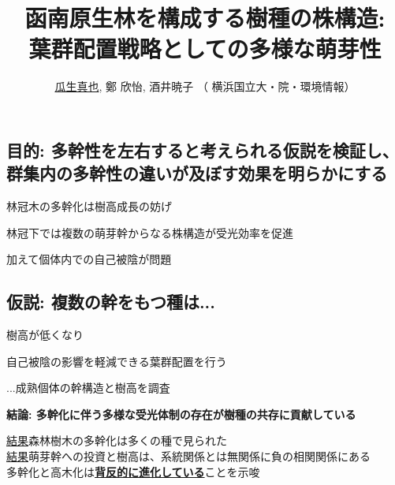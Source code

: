 \documentclass[a0, 36pt, plainboxedsections]{sciposter} %
\title{\textcolor{Blue1}{函南原生林を構成する樹種の株構造:\\葉群配置戦略としての多様な萌芽性}}
\author{\faGroup \hspace{0.02em} \underline{瓜生真也}, 鄭 欣怡, 酒井暁子 （\faUniv \hspace{0.02em} 横浜国立大・院・環境情報） \normalsize{\faEnvelope \hspace{0.02em} \fontspec{ComicSansMS}{suika1127@gmail.com}}}
\begin{document}
\maketitle
\vspace{-2em}
\begin{multicols}{2}
\begin{mdframed}[style=section.frame]
  \centering\huge\textbf{}
\end{mdframed}

\subsection*{目的: 多幹性を左右すると考えられる仮説を検証し、群集内の多幹性の違いが及ぼす効果を明らかにする} %

林冠木の多幹化は樹高成長の妨げ

林冠下では複数の萌芽幹からなる株構造が受光効率を促進

加えて個体内での自己被陰が問題

\subsection*{仮説: 複数の幹をもつ種は...}

\begin{list}{}{\setlength{\itemindent}{1em}} %
 \item 樹高が低くなり
 \item 自己被陰の影響を軽減できる葉群配置を行う
\end{list}

...成熟個体の幹構造と樹高を調査

\columnbreak
\begin{mdframed}[style=conclusion.frame]
  \Large\textbf{\faFlagAlt \vspace{0.02em} 結論: {多幹化に伴う多様な受光体制の存在が樹種の共存に貢献している}} %
  \vspace{0.4em}
  \flushleft\normalsize{
  \underline{結果}森林樹木の多幹化は多くの種で見られた\\
  \underline{結果}萌芽幹への投資と樹高は、系統関係とは無関係に負の相関関係にある\\
  \faHandLeft \vspace{0.02em} 多幹化と高木化は\underline{\textbf{背反的に進化している}}ことを示唆
  
}
\end{mdframed}
\end{multicols}
\end{document}
